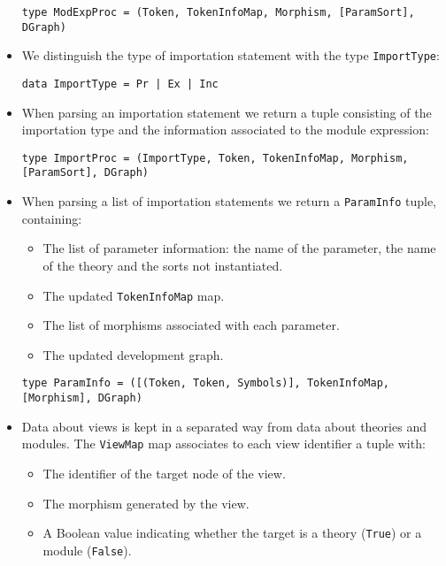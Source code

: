 \begin{itemize}
{\codesize
\begin{verbatim}
type ModExpProc = (Token, TokenInfoMap, Morphism, [ParamSort], DGraph)
\end{verbatim}
}

\item We distinguish the type of importation statement with the type
\verb"ImportType":

{\codesize
\begin{verbatim}
data ImportType = Pr | Ex | Inc
\end{verbatim}
}

\item When parsing an importation statement we return a tuple 
consisting of the importation type and the information associated
to the module expression:

{\codesize
\begin{verbatim}
type ImportProc = (ImportType, Token, TokenInfoMap, Morphism, [ParamSort], DGraph)
\end{verbatim}
}

\item When parsing a list of importation statements we return a
\verb"ParamInfo" tuple, containing:

\begin{itemize}
\item The list of parameter information: the name of the parameter,
the name of the theory and the sorts not instantiated.
\item The updated \verb"TokenInfoMap" map.
\item The list of morphisms associated with each parameter.
\item The updated development graph.
\end{itemize}

{\codesize
\begin{verbatim}
type ParamInfo = ([(Token, Token, Symbols)], TokenInfoMap, [Morphism], DGraph)
\end{verbatim}
}

\item Data about views is kept in a separated way from data about theories
and modules. The \verb"ViewMap" map associates to each view identifier a
tuple with:

\begin{itemize}
\item The identifier of the target node of the view.
\item The morphism generated by the view.
\item A Boolean value indicating whether the target is a theory
(\verb"True") or a module (\verb"False").
\end{itemize}


\end{itemize}

